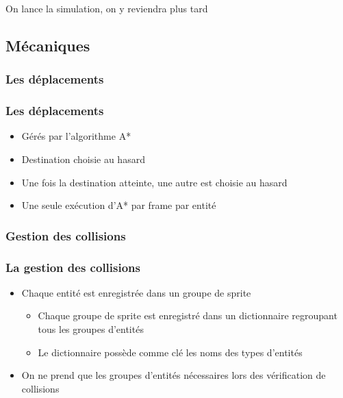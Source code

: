 \documentclass{beamer}
\begin{document}
\begin{frame}
	\begin{large}
		\begin{center}
			On lance la simulation, on y reviendra plus tard
		\end{center}
	\end{large}
\end{frame}

\subsection{Mécaniques}
\subsubsection{Les déplacements}

\begin{frame} \frametitle{Les déplacements}
	\begin{itemize}
		\item Gérés par l'algorithme A*
		\item Destination choisie au hasard
		\item Une fois la destination atteinte, une autre est choisie au hasard
		\item Une seule exécution d'A* par frame par entité
	\end{itemize}
\end{frame}

\subsubsection{Gestion des collisions}

\begin{frame} \frametitle{La gestion des collisions}
	\begin{itemize}
		\item Chaque entité est enregistrée dans un groupe de sprite
		\begin{itemize}
			\item Chaque groupe de sprite est enregistré dans un dictionnaire regroupant tous les groupes d'entités
			\item Le dictionnaire possède comme clé les noms des types d'entités
		\end{itemize}
		\item On ne prend que les groupes d'entités nécessaires lors des vérification de collisions
	\end{itemize}
\end{frame}
\end{document}
